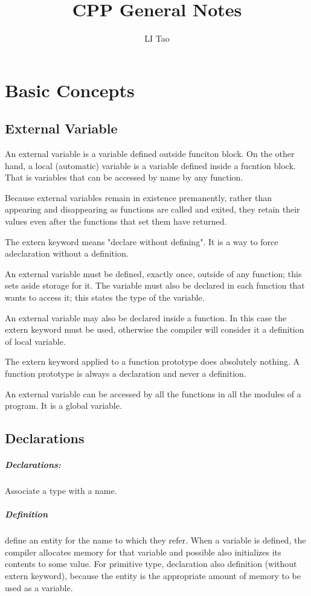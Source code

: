 \documentclass[a4paper,12pt]{book}
\author{LI Tao}
\title{CPP General Notes}
\begin{document}
\maketitle
\chapter{Basic Concepts}
\section{External Variable}
An external variable is a variable defined outside funciton block. On the other hand, a local (automatic) variable is a variable defined inside a fucntion block. That is variables that can be accessed by name by any function. 

Because external variables remain in existence premanently, rather than appearing and disappearing as functions are called and exited, they retain their values even after the functions that set them have returned.

The extern keyword means "declare without defining". It is a way to force adeclaration without a definition.

An external variable must be defined, exactly once, outside of any function; this sets aside storage for it. The variable must also be declared in each function that wants to access it; this states the type of the variable.

An external variable may also be declared inside a function. In this case the extern keyword must be used, otherwise the compiler will consider it a definition of local variable.

The extern keyword applied to a function prototype does absolutely nothing. A function prototype is always a declaration and never a definition.

An external variable can be accessed by all the functions in all the modules of a program. It is a global variable.
\section{Declarations}
\paragraph{Declarations:} Associate a type with a name.
\paragraph{Definition} define an entity for the name to which they refer. When a variable is defined, the compiler allocates memory for that variable and possible also initializes its contents to some value.
For primitive type, declaration also definition (without extern keyword), because the entity is the appropriate amount of memory to be used as a variable.
\end{document}
